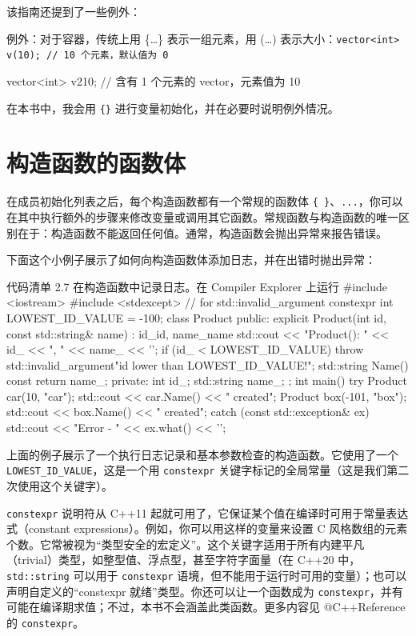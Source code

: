 该指南还提到了一些例外：

\begin{myQuote}
例外：对于容器，传统上用 \{…\} 表示一组元素，用 (…) 表示大小：\texttt{vector<int> v(10); // 10 个元素，默认值为 0}
\end{myQuote}

\begin{codebox}[cpp]
vector<int> v2{10}; // 含有 1 个元素的 vector，元素值为 10
\end{codebox}

在本书中，我会用 \texttt{\{\}} 进行变量初始化，并在必要时说明例外情况。

\section{构造函数的函数体}

在成员初始化列表之后，每个构造函数都有一个常规的函数体 \texttt{\{ \}}、\texttt{...}，你可以在其中执行额外的步骤来修改变量或调用其它函数。常规函数与构造函数的唯一区别在于：构造函数不能返回任何值。通常，构造函数会抛出异常来报告错误。

下面这个小例子展示了如何向构造函数体添加日志，并在出错时抛出异常：

\begin{codeboxt}[cpp]{代码清单 2.7 在构造函数中记录日志。在 Compiler Explorer 上运行}
#include <iostream>
#include <stdexcept> // for std::invalid_argument
constexpr int LOWEST_ID_VALUE = -100;
class Product {
public:
explicit Product(int id, const std::string& name)
: id_{id}, name_{name} {
std::cout << "Product(): " << id_ << ", " << name_ << '\n';
if (id_ < LOWEST_ID_VALUE)
throw std::invalid_argument{"id lower than LOWEST_ID_VALUE!"};
}
std::string Name() const { return name_; }
private:
int id_;
std::string name_;
};
int main() {
try {
Product car(10, "car");
std::cout << car.Name() << " created\n";
Product box(-101, "box");
std::cout << box.Name() << " created\n";
}
catch (const std::exception& ex) {
std::cout << "Error - " << ex.what() << '\n';
}
}
\end{codeboxt}

上面的例子展示了一个执行日志记录和基本参数检查的构造函数。它使用了一个 \texttt{LOWEST\_ID\_VALUE}，这是一个用 \texttt{constexpr} 关键字标记的全局常量（这是我们第二次使用这个关键字）。

\begin{myInfoBox}
\texttt{constexpr} 说明符从 C++11 起就可用了，它保证某个值在编译时可用于常量表达式（constant expressions）。例如，你可以用这样的变量来设置 C 风格数组的元素个数。它常被视为“类型安全的宏定义”。这个关键字适用于所有内建平凡（trivial）类型，如整型值、浮点型，甚至字符字面量（在 C++20 中，\texttt{std::string} 可以用于 \texttt{constexpr} 语境，但不能用于运行时可用的变量）；也可以声明自定义的“constexpr 就绪”类型。你还可以让一个函数成为 \texttt{constexpr}，并有可能在编译期求值；不过，本书不会涵盖此类函数。更多内容见 @C++Reference 的 \texttt{constexpr}。
\end{myInfoBox}

